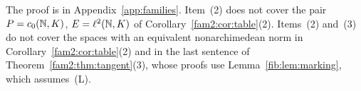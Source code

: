 The proof is in Appendix~\ref{app:families}. Item~(2) does not cover the pair $P=c_0(\mathbb N,K)$, $E=\ell^2(\mathbb N,K)$ of
Corollary~\ref{fam2:cor:table}(2). Items~(2) and~(3) do not cover the spaces with an equivalent nonarchimedean norm in
Corollary~\ref{fam2:cor:table}(2) and in the last sentence of Theorem~\ref{fam2:thm:tangent}(3), whose proofs use
Lemma~\ref{fib:lem:marking}, which assumes~\textup{(L)}.

